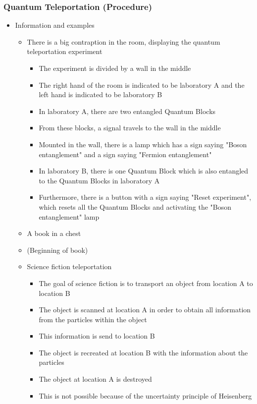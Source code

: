 \documentclass[11pt,twoside]{report} %
\begin{document}
\subsubsection{Quantum Teleportation (Procedure)}
	\begin{itemize}
		\item Information and examples
		\begin{itemize}
			\item There is a big contraption in the room, displaying the quantum teleportation experiment
			\begin{itemize}
				\item The experiment is divided by a wall in the middle
				\item The right hand of the room is indicated to be laboratory A and the left hand is indicated to be laboratory B
				\item In laboratory A, there are two entangled Quantum Blocks
				\item From these blocks, a signal travels to the wall in the middle
				\item Mounted in the wall, there is a lamp which has a sign saying "Boson entanglement" and a sign saying "Fermion entanglement"
				\item In laboratory B, there is one Quantum Block which is also entangled to the Quantum Blocks in laboratory A
				\item Furthermore, there is a button with a sign saying "Reset experiment", which resets all the Quantum Blocks and activating the "Boson entanglement" lamp
			\end{itemize}
			\item A book in a chest
			\item (Beginning of book)
			\item Science fiction teleportation
			\begin{itemize}
				\item The goal of science fiction is to transport an object from location A to location B
				\item The object is scanned at location A in order to obtain all information from the particles within the object
				\item This information is send to location B
				\item The object is recreated at location B with the information about the particles
				\item The object at location A is destroyed
				\item This is not possible because of the uncertainty principle of Heisenberg

\end{itemize}
\end{itemize}
\end{itemize}
\end{document}

